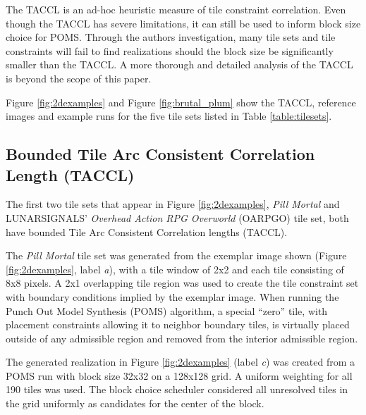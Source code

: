 The TACCL is an ad-hoc heuristic measure of tile constraint correlation.
Even though the TACCL has severe limitations, it can still be used to inform block size choice for POMS.
Through the authors investigation, many tile sets and tile constraints will fail to find realizations should the block size be significantly
smaller than the TACCL.
A more thorough and detailed analysis of the TACCL is beyond the scope of this paper.

Figure \ref{fig:2dexamples} and Figure \ref{fig:brutal_plum} show the TACCL, reference images and example runs
for the five tile sets listed in Table \ref{table:tilesets}.




\subsection{Bounded Tile Arc Consistent Correlation Length (TACCL)}

The first two tile sets that appear in Figure \ref{fig:2dexamples}, \textit{Pill Mortal} and LUNARSIGNALS' \textit{Overhead Action RPG Overworld}
(OARPGO) tile set, both
have bounded Tile Arc Consistent Correlation lengths (TACCL).

The \textit{Pill Mortal} tile set was generated from the exemplar image shown (Figure \ref{fig:2dexamples}, label \textit{a}), with a tile window of 2x2
and each tile consisting of 8x8 pixels.
A 2x1 overlapping tile region was used to create the tile constraint set with boundary conditions implied by the exemplar image.
When running the Punch Out Model Synthesis (POMS) algorithm, a special ``zero'' tile,
  with placement constraints allowing it to neighbor boundary tiles,
is virtually placed outside of any admissible region and removed from the interior admissible region.

The generated realization in Figure \ref{fig:2dexamples} (label \textit{c}) was created from a POMS run with block size 32x32 on a 128x128 grid.
A uniform weighting for all 190 tiles was used.
The block choice scheduler considered all unresolved tiles in the grid uniformly as candidates for the center of the block.

